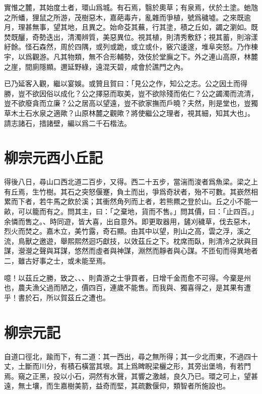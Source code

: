 實惟之麓，其始度土者，環山爲城。有石焉，翳於奧草；有泉焉，伏於土塗。{虵}虺之所蟠，{狸}鼠之所游，茂樹惡木，嘉葩毒卉，亂雜而爭植，號爲穢墟。之來既逾月，理甚無事，望其地，且異之。始命芟其蕪，行其塗，積之丘如，蠲之瀏如。既焚既釃，奇勢迭出，清濁辨質，美惡異位。視其植，則清秀敷舒；視其蓄，則溶漾紆餘。怪石森然，周於四隅，或列或跪，或立或仆，竅穴逶邃，堆阜突怒。乃作棟宇，以爲觀游。凡其物類，無不合形輔勢，效伎於堂廡之下。外之連山高原，林麓之崖，間廁隱顯。邇延野綠，遠混天碧，咸會於譙門之內。

已乃延客入觀，繼以宴娛。或贊且賀曰：「見公之作，知公之志。公之因土而得勝，豈不欲因俗以成化？公之擇惡而取美，豈不欲除殘而佑仁？公之蠲濁而流清，豈不欲廢貪而立廉？公之居高以望遠，豈不欲家撫而戶曉？夫然，則是堂也，豈獨草木土石水泉之適歟？山原林麓之觀歟？將使繼公之理者，視其細，知其大也」。請志諸石，措諸壁，編以爲二千石楷法。

\theendnotes

\section[鈷鉧潭西小丘記\quad{\small 柳宗元}]{{\normalsize 柳宗元}\quad {}西小丘記}
得後八日，尋山口西北道二百步，又得。西二十五步，當湍而浚者爲魚梁。梁之上有丘焉，生竹樹。其石之突怒偃蹇，負土而出，爭爲奇狀者，殆不可數。其嶔然相累而下者，若牛馬之飲於溪；其衝然角列而上者，若熊羆之登於山。丘之小不能一畝，可以籠而有之。問其主，曰：「之棄地，貨而不售。」問其價，曰：「止四百。」余憐而售之。、時同遊，皆大喜，出自意外。即更取器用，鏟刈穢草，伐去惡木，烈火而焚之。嘉木立，美竹露，奇石顯。由其中以望，則山之高，雲之浮，溪之流，鳥獸之邀遊，舉熙熙然迴巧獻技，以效茲丘之下。枕席而臥，則清泠之狀與目謀，瀯瀯之聲與耳謀，悠然而虛者與神謀，淵然而靜者與心謀。不匝旬而得異地者二，雖古好事之士，或未能至焉。

噫！以茲丘之勝，致之、、、則貴游之士爭買者，日增千金而愈不可得。今棄是州也，農夫漁父過而陋之，價四百，連歲不能售。而我與、獨喜得之，是其果有遭乎！書於石，所以賀茲丘之遭也。

\section[小石城山記\quad{\small 柳宗元}]{{\normalsize 柳宗元}\quad {}記}
自道口徑北，踰而下，有二道：其一西出，尋之無所得；其一少北而東，不過四十丈，土斷而川分，有積石橫當其垠。其上爲睥睨梁欐之形，其旁出堡塢，有若門焉。窺之正黑，投以小石，洞然有水聲，其響之激越，良久乃已。環之可上，望甚遠，無土壤，而生嘉樹美箭，益奇而堅，其疏數偃仰，類智者所施設也。

